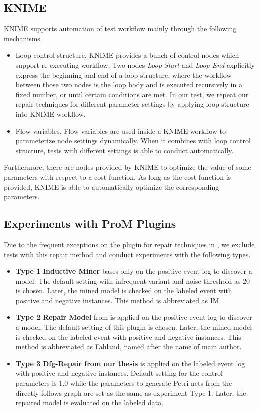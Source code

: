\subsection{KNIME}
KNIME supports automation of test workflow mainly through the following mechanisms. 
\begin{itemize}
	\item Loop control structure. KNIME provides a bunch of control nodes which support re-executing workflow.  Two nodes \emph{Loop Start} and \emph{Loop End} explicitly express the beginning and end of a loop structure, where the workflow between those two nodes is the loop body and is executed recursively in a fixed number, or until certain conditions are met. In our test, we repeat our repair techniques for different parameter settings by applying loop structure into KNIME workflow.
	\item Flow variables. Flow variables are used inside a KNIME workflow to parameterize node settings dynamically. When it combines with loop control structure, tests with different settings is able to conduct automatically.
\end{itemize}
Furthermore, there are nodes provided by KNIME to optimize the value of some parameters with respect to a cost function. As long as the cost function is provided, KNIME is able to automatically optimize the corresponding parameters. 

\subsection{ Experiments with ProM Plugins}
Due to the frequent exceptions on the plugin for repair techniques in \cite{dees2017enhancing}, we exclude tests with this repair method  and conduct experiments with the following types. 
\begin{itemize}
	\item \textbf{Type 1} \textbf{Inductive Miner} bases only on the positive event log to discover a model. The default setting with infrequent variant and noise threshold as 20 is chosen. Later, the mined model is checked on the labeled event with positive and negative instances. This method is abbreviated as IM.
	\item \textbf{Type 2} \textbf{Repair Model} from \cite{fahland2015model} is applied on the positive event log to discover a model. The default setting of this plugin is chosen. Later, the mined model is checked on the labeled event with positive and negative instances. This method is abbreviated as Fahland, named after the name of main author.
	\item \textbf{Type 3} \textbf{Dfg-Repair from our thesis} is applied on the labeled event log with positive and negative instances. Default setting  for the control parameters is 1.0 while the parameters to generate Petri nets from the directly-follows graph are set as the same as experiment Type 1.  Later, the repaired model is evaluated on the labeled data. 
\end{itemize}

